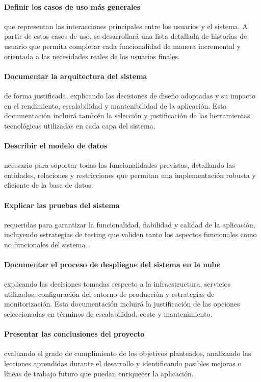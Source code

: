 \paragraph*{Definir los casos de uso más generales}
que representan las interacciones principales entre los usuarios y el sistema. A partir de estos casos de uso, se desarrollará una lista detallada de historias de usuario que permita completar cada funcionalidad de manera incremental y orientada a las necesidades reales de los usuarios finales.

\paragraph*{Documentar la arquitectura del sistema}
de forma justificada, explicando las decisiones de diseño adoptadas y su impacto en el rendimiento, escalabilidad y mantenibilidad de la aplicación. Esta documentación incluirá también la selección y justificación de las herramientas tecnológicas utilizadas en cada capa del sistema.

\paragraph*{Describir el modelo de datos}
necesario para soportar todas las funcionalidades previstas, detallando las entidades, relaciones y restricciones que permitan una implementación robusta y eficiente de la base de datos.

\paragraph*{Explicar las pruebas del sistema}
requeridas para garantizar la funcionalidad, fiabilidad y calidad de la aplicación, incluyendo estrategias de testing que validen tanto los aspectos funcionales como no funcionales del sistema.

\paragraph*{Documentar el proceso de despliegue del sistema en la nube}
explicando las decisiones tomadas respecto a la infraestructura, servicios utilizados, configuración del entorno de producción y estrategias de monitorización. Esta documentación incluirá la justificación de las opciones seleccionadas en términos de escalabilidad, coste y mantenimiento.

\paragraph*{Presentar las conclusiones del proyecto}
evaluando el grado de cumplimiento de los objetivos planteados, analizando las lecciones aprendidas durante el desarrollo y identificando posibles mejoras o líneas de trabajo futuro que puedan enriquecer la aplicación.

